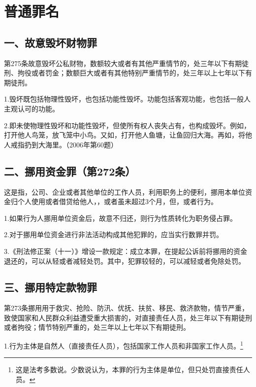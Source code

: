 \section{普通罪名}

\subsection*{一、故意毁坏财物罪}

第275条故意毁坏公私财物，数额较大或者有其他严重情节的，处三年以下有期徒刑、拘役或者罚金；数额巨大或者有其他特别严重情节的，处三年以上七年以下有期徒刑。

1.毁坏既包括物理性毁坏，也包括功能性毁坏。功能包括客观功能，也包括一般人主观认可的功能。

2.即未使物理性毁坏和功能性毁坏，但使所有权人丧失占有，也构成毁坏。例如，打开他人鸟笼，放飞笼中小鸟。又如，打开他人鱼塘，让鱼回归大海。再如，将他人戒指扔到大海里。（2006年第60题）

\subsection*{二、挪用资金罪（第272条）}

这是指，公司、企业或者其他单位的工作人员，利用职务上的便利，挪用本单位资金归个人使用或者借贷给他人，，或者虽未超过3个月，但，或者行为。

1.如果行为人挪用单位资金后，故意不归还，则行为性质转化为职务侵占罪。

2.对于挪用单位资金进行非法活动构成其他犯罪的，应当实行数罪并罚。

3.《刑法修正案（十一）》增设一款规定：成立本罪，在提起公诉前将挪用的资金退还的，可以从轻或者减轻处罚。其中，犯罪较轻的，可以减轻或者免除处罚。

\subsection*{三、挪用特定款物罪}

第273条挪用用于救灾、抢险、防汛、优抚、扶贫、移民、救济款物，情节严重，致使国家和人民群众利益遭受重大损害的，对直接责任人员，处三年以下有期徒刑或者拘役；情节特别严重的，处三年以上七年以下有期徒刑。

1.行为主体是自然人（直接责任人员），包括国家工作人员和非国家工作人员。\footnote{这是法考多数说。少数说认为，本罪的行为主体是单位，但只处罚直接责任人员。}

